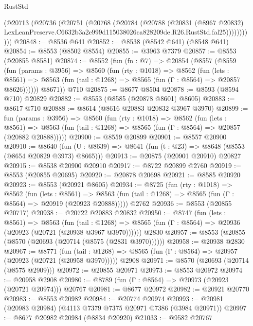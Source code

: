 \begin{lexlean}{RustStd}
\begin{coremodule}
            (@20713
              (@20736
                (@20751
                  (@20768
                    (@20784
                      (@20788
                        (@20831
                          (@8967 @20832)
                          LexLeanPreserve.C6632b3a2e999d115038026ca828209de.R26.RustStd.fal25)))))))))))
@20848 := @8536 @641
@20852 := @8538 (@8542 @641) (@8548 @641)
@20854 := @8553 (@8502 @8554)
@20855 := @3963 @7379
@20857 := @8553 (@20855 @8581)
@20874 := @8552
    (fun (fn : @7) =>
    @20854
      (@8557
        (@8559
          (fun (params : @3956) =>
          @8560
            (fun (rty : @1018) =>
            @8562
              (fun (lets : @8561) =>
              @8563 (fun (tail : @1268) => @8565 (fun (Γ : @8564) => @20857 @8626))))))
        @8671))
    @710
@20875 := @8677 @8504
@20878 := @8593 (@8594 @710) @20829
@20882 := @8553 (@8585 (@20878 @8601) @8605)
@20883 := @8617 @710
@20888 := @8614 (@8616 @20883 @20832 @3967 @3970)
@20899 := fun (params : @3956) =>
  @8560
    (fun (rty : @1018) =>
    @8562
      (fun (lets : @8561) =>
      @8563 (fun (tail : @1268) => @8565 (fun (Γ : @8564) => @20857 (@20882 @20888)))))
@20900 := @8559 @20899
@20901 := @8557 @20900
@20910 := @8640
    (fun (U : @8639) => @8641 (fun (t : @23) => @8648 (@8553 (@8654 @20829 @3973) @8665)))
@20913 := @20875 (@20901 @20910) @20827
@20915 := @8538 @20900 @20910
@20917 := @8722 @20899 @2760
@20919 := @8553 (@20855 @20695)
@20920 := @20878 @20698
@20921 := @8585 @20920
@20923 := @8553 (@20921 @8605)
@20934 := @8725
    (fun (rty : @1018) =>
    @8562
      (fun (lets : @8561) =>
      @8563 (fun (tail : @1268) => @8565 (fun (Γ : @8564) => @20919 (@20923 @20888)))))
    @2762
@20936 := @8553 (@20855 @20717)
@20938 := @20722 @20883 @20832
@20950 := @8747
    (fun (lets : @8561) =>
    @8563
      (fun (tail : @1268) =>
      @8565 (fun (Γ : @8564) => @20936 (@20923 (@20721 (@20938 @3967 @3970))))))
    @2830
@20957 := @8553 (@20855 (@8570 (@20693 (@20714 (@8575 (@2831 @3970))))))
@20958 := @20938 @2830
@20967 := @8771
    (fun (tail : @1268) => @8565 (fun (Γ : @8564) => @20957 (@20923 (@20721 (@20958 @3970)))))
    @2908
@20971 := @8570 (@20693 (@20714 (@8575 @2909)))
@20972 := @20855 @20971
@20973 := @8553 @20972
@20974 := @20958 @2908
@20980 := @8789 (fun (Γ : @8564) => @20973 (@20923 (@20721 @20974))) @20767
@20981 := @8677 @20972
@20982 := @20921 @20770
@20983 := @8553 @20982
@20984 := @20774 @20974
@20993 := @20981 (@20983 @20984) (@4113 @7379 @7375 @20971 @7386 (@3984 @20971))
@20997 := @8677 @20982 @20984 (@8834 @20920)
@21033 := @9582
    @20767

\end{coremodule}
\end{lexlean}
